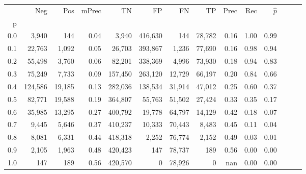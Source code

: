\begin{tabular}{rrrrrrrrrrrrrr}
\toprule
{} &      Neg &     Pos & mPrec &       TN &       FP &      FN &      TP &  Prec &   Rec & $\hat{p}$ \\
p   &          &         &       &          &          &         &         &       &       &           \\
\midrule
0.0 &    3,940 &     144 &  0.04 &    3,940 &  416,630 &     144 &  78,782 &  0.16 &  1.00 &      0.99 \\
0.1 &   22,763 &   1,092 &  0.05 &   26,703 &  393,867 &   1,236 &  77,690 &  0.16 &  0.98 &      0.94 \\
0.2 &   55,498 &   3,760 &  0.06 &   82,201 &  338,369 &   4,996 &  73,930 &  0.18 &  0.94 &      0.83 \\
0.3 &   75,249 &   7,733 &  0.09 &  157,450 &  263,120 &  12,729 &  66,197 &  0.20 &  0.84 &      0.66 \\
0.4 &  124,586 &  19,185 &  0.13 &  282,036 &  138,534 &  31,914 &  47,012 &  0.25 &  0.60 &      0.37 \\
0.5 &   82,771 &  19,588 &  0.19 &  364,807 &   55,763 &  51,502 &  27,424 &  0.33 &  0.35 &      0.17 \\
0.6 &   35,985 &  13,295 &  0.27 &  400,792 &   19,778 &  64,797 &  14,129 &  0.42 &  0.18 &      0.07 \\
0.7 &    9,445 &   5,646 &  0.37 &  410,237 &   10,333 &  70,443 &   8,483 &  0.45 &  0.11 &      0.04 \\
0.8 &    8,081 &   6,331 &  0.44 &  418,318 &    2,252 &  76,774 &   2,152 &  0.49 &  0.03 &      0.01 \\
0.9 &    2,105 &   1,963 &  0.48 &  420,423 &      147 &  78,737 &     189 &  0.56 &  0.00 &      0.00 \\
1.0 &      147 &     189 &  0.56 &  420,570 &        0 &  78,926 &       0 &   nan &  0.00 &      0.00 \\
\bottomrule
\end{tabular}
